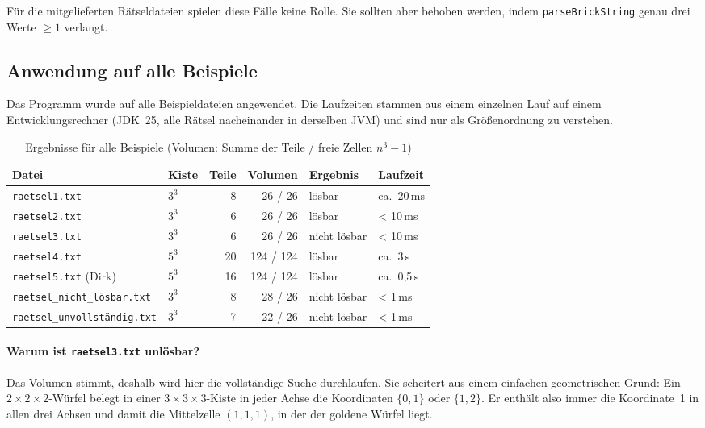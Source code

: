 \documentclass[11pt,a4paper,parskip=half]{scrartcl}
\newcommand{\code}[1]{\texttt{#1}}
\newcommand{\file}[1]{\texttt{#1}}
\begin{document}
Für die mitgelieferten Rätseldateien spielen diese Fälle keine Rolle. Sie sollten
aber behoben werden, indem \code{parseBrickString} genau drei Werte $\geq 1$
verlangt.

\subsection{Anwendung auf alle Beispiele}
\label{sec:ergebnisse}

Das Programm wurde auf alle Beispieldateien angewendet. Die Laufzeiten stammen aus
einem einzelnen Lauf auf einem Entwicklungsrechner (JDK~25, alle Rätsel nacheinander
in derselben JVM) und sind nur als Größenordnung zu verstehen.

\begin{table}[H]
\centering
\begin{tabular}{@{}llrrll@{}}
\toprule
\textbf{Datei} & \textbf{Kiste} & \textbf{Teile} & \textbf{Volumen} & \textbf{Ergebnis} & \textbf{Laufzeit} \\
\midrule
\file{raetsel1.txt} & $3^3$ & 8  & 26 / 26   & lösbar       & ca.\ 20\,ms \\
\file{raetsel2.txt} & $3^3$ & 6  & 26 / 26   & lösbar       & < 10\,ms \\
\file{raetsel3.txt} & $3^3$ & 6  & 26 / 26   & nicht lösbar & < 10\,ms \\
\file{raetsel4.txt} & $5^3$ & 20 & 124 / 124 & lösbar       & ca.\ 3\,s \\
\file{raetsel5.txt} (Dirk) & $5^3$ & 16 & 124 / 124 & lösbar & ca.\ 0{,}5\,s \\
\file{raetsel\_nicht\_lösbar.txt}   & $3^3$ & 8 & 28 / 26 & nicht lösbar & < 1\,ms \\
\file{raetsel\_unvollständig.txt}   & $3^3$ & 7 & 22 / 26 & nicht lösbar & < 1\,ms \\
\bottomrule
\end{tabular}
\caption{Ergebnisse für alle Beispiele (Volumen: Summe der Teile / freie Zellen $n^3-1$)}
\label{tab:ergebnisse}
\end{table}

\paragraph{Warum ist \file{raetsel3.txt} unlösbar?}
Das Volumen stimmt, deshalb wird hier die vollständige Suche durchlaufen. Sie
scheitert aus einem einfachen geometrischen Grund: Ein $2\times2\times2$-Würfel
belegt in einer $3\times3\times3$-Kiste in jeder Achse die Koordinaten $\{0,1\}$ oder
$\{1,2\}$. Er enthält also immer die Koordinate~1 in allen drei Achsen und damit die
Mittelzelle $(1,1,1)$, in der der goldene Würfel liegt.
\end{document}
